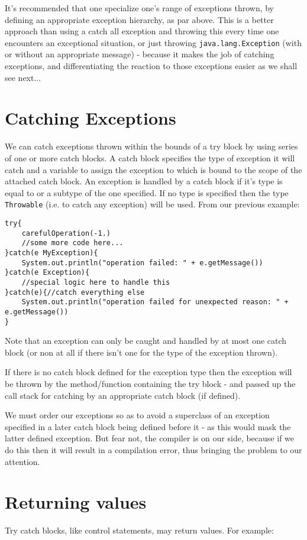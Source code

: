 \documentclass[conc-doc]{subfiles}
\begin{document}
It's recommended that one specialize one's range of exceptions thrown, by defining an appropriate exception hierarchy, as par above. This is a better approach than using a catch all exception and throwing this every time one encounters an exceptional situation, or just throwing \lstinline{java.lang.Exception} (with or without an appropriate message) - because it makes the job of catching exceptions, and differentiating the reaction to those exceptions easier as we shall see next...

\section{Catching Exceptions}
We can catch exceptions thrown within the bounds of a try block by using series of one or more catch blocks. A catch block specifies the type of exception it will catch and a variable to assign the exception to which is bound to the scope of the attached catch block. An exception is handled by a catch block if it's type is equal to or a subtype of the one specified. If no type is specified then the type \lstinline{Throwable} (i.e. to catch any exception) will be used. From our previous example:

\begin{lstlisting}
try{
	carefulOperation(-1.)
	//some more code here...
}catch(e MyException){
	System.out.println("operation failed: " + e.getMessage())
}catch(e Exception){
	//special logic here to handle this
}catch(e){//catch everything else
	System.out.println("operation failed for unexpected reason: " + e.getMessage())
}
\end{lstlisting}

Note that an exception can only be caught and handled by at most one catch block (or non at all if there isn't one for the type of the exception thrown).

If there is no catch block defined for the exception type then the exception will be thrown by the method/function containing the try block - and passed up the call stack for catching by an appropriate catch block (if defined).

We must order our exceptions so as to avoid a superclass of an exception specified in a later catch block being defined before it - as this would mask the latter defined exception. But fear not, the compiler is on our side, because if we do this then it will result in a compilation error, thus bringing the problem to our attention.

\section{Returning values}
Try catch blocks, like control statements, may return values. For example:
\end{document}
